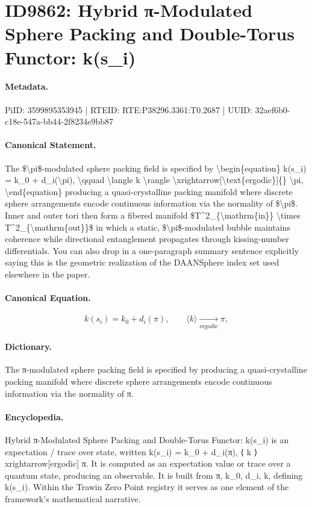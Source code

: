 \section*{ID9862: Hybrid π-Modulated Sphere Packing and Double-Torus Functor: k(s\_i)}
\paragraph{Metadata.}
PiID: 3599895353945 | RTEID: RTE:P38296.3361:T0.2687 | UUID: 32aef6b0-c18e-547a-bb44-2f8234e9bb87

\paragraph{Canonical Statement.}
The \$\textbackslash{}pi\$-modulated sphere packing field is specified by \textbackslash{}begin\{equation\} k(s\_i) = k\_0 + d\_i(\textbackslash{}pi), \textbackslash{}qquad \textbackslash{}langle k \textbackslash{}rangle \textbackslash{}xrightarrow[\textbackslash{}text\{ergodic\}]\{\} \textbackslash{}pi, \textbackslash{}end\{equation\} producing a quasi-crystalline packing manifold where discrete sphere arrangements encode continuous information via the normality of \$\textbackslash{}pi\$. Inner and outer tori then form a fibered manifold \$T\textasciicircum{}2\_\{\textbackslash{}mathrm\{in\}\} \textbackslash{}times T\textasciicircum{}2\_\{\textbackslash{}mathrm\{out\}\}\$ in which a static, \$\textbackslash{}pi\$-modulated bubble maintains coherence while directional entanglement propagates through kissing-number differentials. You can also drop in a one-paragraph summary sentence explicitly saying this is the geometric realization of the DAANSphere index set used elsewhere in the paper.

\paragraph{Canonical Equation.}
\[
k(s_i) = k_0 + d_i(\pi), \qquad \langle k \rangle \xrightarrow[\text{ergodic}]{} \pi,
\]

\paragraph{Dictionary.}
The π-modulated sphere packing field is specified by producing a quasi-crystalline packing manifold where discrete sphere arrangements encode continuous information via the normality of π.

\paragraph{Encyclopedia.}
Hybrid π-Modulated Sphere Packing and Double-Torus Functor: k(s\_i) is an expectation / trace over state, written k(s\_i) = k\_0 + d\_i(π), ⟨ k ⟩ xrightarrow[ergodic] π. It is computed as an expectation value or trace over a quantum state, producing an observable. It is built from π, k\_0, d\_i, k, defining k(s\_i). Within the Trawin Zero Point registry it serves as one element of the framework's mathematical narrative.
